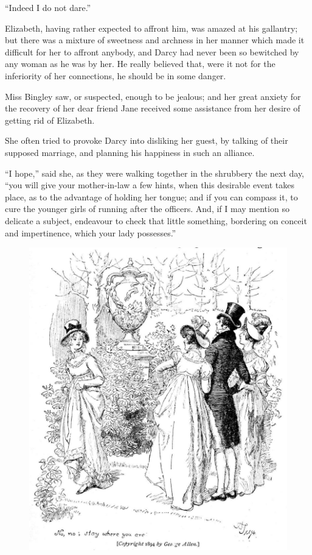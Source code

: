 \documentclass[10pt]{book}
\begin{document}
   “Indeed I do not dare.”
  

   Elizabeth, having rather expected to affront him, was amazed at his
gallantry; but there was a mixture of sweetness and archness in her
manner which made it difficult for her to affront anybody, and Darcy had
never been so bewitched by any woman as he was by her. He really
believed that, were it not for the inferiority of her connections, he
should be in some danger.
  

   Miss Bingley saw, or suspected, enough to be jealous; and her great
anxiety for the recovery of her dear friend Jane received some
assistance from her desire of getting rid of Elizabeth.
  

   She often tried to provoke Darcy into disliking her guest, by talking of
their supposed marriage, and planning his happiness in such an alliance.
  

   “I hope,” said she, as they were walking together in
   the shrubbery the
next day, “you will give your mother-in-law a few hints, when this
desirable event takes place, as to the advantage of holding her tongue;
and if you can compass it, to cure the younger girls of running after
the officers. And, if I may mention so delicate a subject, endeavour to
check that little something, bordering on conceit and impertinence,
which your lady possesses.”
  

\begin{figure}[h]
\centering
\includegraphics[width=\linewidth]{images/i_096.jpg}
\end{figure}
\end{document}

